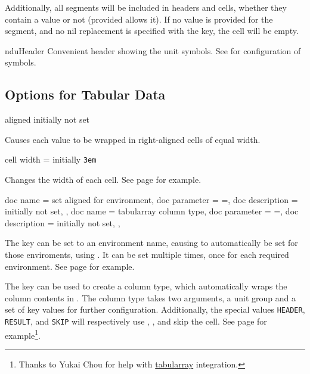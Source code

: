 \documentclass[
	a4paper,
	margin=4cm
]{article}
\begin{document}
Additionally, all segments will be included in headers and cells, whether they contain a value or not (provided  allows it). If no value is provided for the segment, and no nil replacement is specified with the  key, the cell will be empty.

\begin{docCommand}
	{nduHeader}
	{}
	Convenient header showing the unit symbols. See  for configuration of symbols.
\end{docCommand}

\subsection{Options for Tabular Data}

\begin{docKey}
	{aligned}
	{}
	{initially not set}

Causes each value to be wrapped in right-aligned cells of equal width.
\end{docKey}

\begin{docKey}
	{cell width}
	{=}
	{initially \texttt{3em}}

Changes the width of each cell. See page \pageref{example:table:width} for example.
\end{docKey}

\begin{docKeys}
	[]
	{
		{
			doc name = set aligned for environment,
			doc parameter = {=},
			doc description = {initially not set},
		},
		{
			doc name = tabularray column type,
			doc parameter = {=},
			doc description = {initially not set},
		},
	}

	The  key can be set to an environment name, causing  to automatically be set for those enviroments, using . It can be set multiple times, once for each required environment. See page \pageref{example:table:environment} for example.

	The  key can be used to create a column type, which automatically wraps the column contents in . The column type takes two arguments, a unit group and a set of key values for further configuration. Additionally, the special values \texttt{HEADER},  \texttt{RESULT}, and \texttt{SKIP} will respectively use , , and skip the cell. See page \pageref{example:table:tabularray} for example\footnote{Thanks to Yukai Chou for help with \href{https://github.com/lvjr/tabularray}{tabularray} integration.}.

\end{docKeys}
\end{document}
